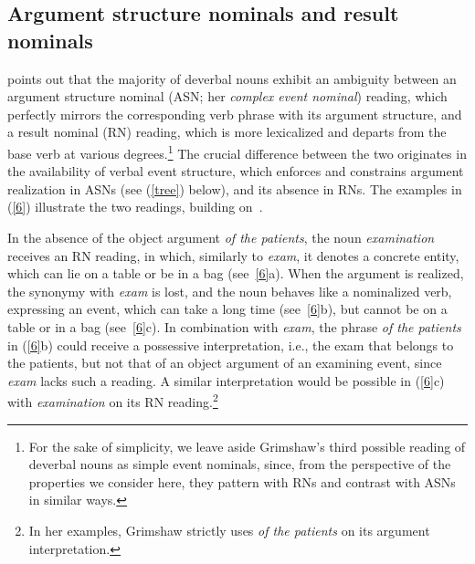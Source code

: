 \documentclass[output=paper]{langsci/langscibook}
\begin{document}
\begin{exe}
\end{exe}

\subsection{Argument structure nominals and result nominals}\label{sec:lit:ASN:RN}

\cite{grimshaw:90} points out that the majority of deverbal nouns exhibit an ambiguity between an  argument structure nominal  (ASN; her {\it complex event nominal}) reading, which perfectly mirrors the corresponding verb phrase with its argument structure,  and  a result nominal (RN) reading, which is more lexicalized and departs from the base verb at various degrees.\footnote{For the sake of simplicity, we leave aside Grimshaw's third possible reading of deverbal nouns as simple event nominals, since, from the perspective of the properties we consider here, they pattern with RNs and contrast with ASNs in similar ways.} The crucial difference between the two originates in the availability of verbal event structure,  which enforces and constrains argument realization in ASNs (see (\ref{tree}) below), and its absence in RNs. The examples in (\ref{6}) illustrate the two readings, building on~\citet[49]{grimshaw:90}.

\begin{exe}
\end{exe}

In the absence of the object argument \textit{of the patients}, the noun \textit{examination} receives an RN reading, in which, similarly to \textit{exam}, it denotes a concrete entity, which can lie on a table  {or be in a bag} (see~\ref{6}a). When the argument is realized, the synonymy with \textit{exam} is lost, and the noun behaves like a nominalized verb, expressing an event, which can take a long time (see~\ref{6}b), but cannot be on a table or in a bag (see~\ref{6}c).  {In combination with \textit{exam}, the phrase \textit{of the patients} in (\ref{6}b) could receive a possessive interpretation, i.e., the exam that belongs to the patients, but not that of an object argument of an examining event, since \textit{exam} lacks such a reading. A similar interpretation would be possible in (\ref{6}c) with \textit{examination} on its RN reading.}\footnote{In her examples, Grimshaw strictly uses \textit{of the patients} on its argument interpretation.}
\end{document}

